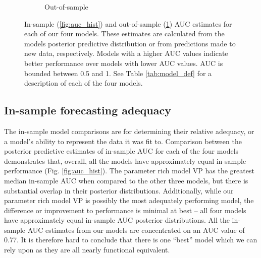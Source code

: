 \documentclass[12pt,letterpaper]{article}
\begin{document}
\begin{refsection}
\begin{figure}[ht]
\begin{subfigure}[ht]{0.45\textwidth}
    \caption{Out-of-sample}
    \label{fig:fold_auc}
  \end{subfigure}
  \caption{In-sample (\ref{fig:auc_hist}) and out-of-sample (\ref{fig:fold_auc}) AUC estimates for each of our four models. These estimates are calculated from the models posterior predictive distribution or from predictions made to new data, respectively. Models with a higher AUC values indicate better performance over models with lower AUC values. AUC is bounded between 0.5 and 1. See Table \ref{tab:model_def} for a description of each of the four models.}
  \label{fig:auc_compare}
\end{figure}

\subsection{In-sample forecasting adequacy}

The in-sample model comparisons are for determining their relative adequacy, or a model's ability to represent the data it was fit to. Comparison between the posterior predictive estimates of in-sample AUC for each of the four models demonstrates that, overall, all the models have approximately equal in-sample performance (Fig. \ref{fig:auc_hist}). The parameter rich model VP has the greatest median in-sample AUC when compared to the other three models, but there is substantial overlap in their posterior distributions. Additionally, while our parameter rich model VP is possibly the most adequately performing model, the difference or improvement to performance is minimal at best -- all four models have approximately equal in-sample AUC posterior distributions. All the in-sample AUC estimates from our models are concentrated on an AUC value of 0.77. It is therefore hard to conclude that there is one ``best'' model which we can rely upon as they are all nearly functional equivalent. 




\end{refsection}
\end{document}
